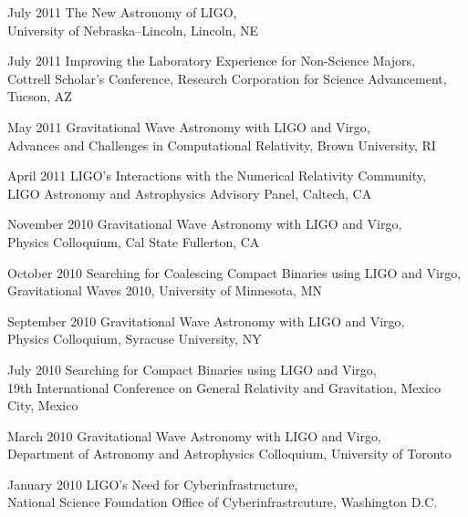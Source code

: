 \documentclass{cv}
\begin{document}
\begin{entry}
\item[July 2011] {The New Astronomy of LIGO},\\
{\small University of Nebraska--Lincoln, Lincoln, NE}

\item[July 2011] {Improving the Laboratory Experience for Non-Science Majors},\\
{\small Cottrell Scholar's Conference, Research Corporation for Science
Advancement, Tucson, AZ}

\item[May 2011] {Gravitational Wave Astronomy with LIGO and Virgo},\\
{\small Advances and Challenges in Computational Relativity, Brown University,
RI}

\item[April 2011] {LIGO's Interactions with the Numerical Relativity Community},\\
{\small LIGO Astronomy and Astrophysics Advisory Panel, Caltech, CA}

\item[November 2010] {Gravitational Wave Astronomy with LIGO and Virgo},\\
{\small Physics Colloquium, Cal State Fullerton, CA}

\item[October 2010] {Searching for Coalescing Compact Binaries using LIGO and
Virgo},\\
{\small Gravitational Waves 2010, University of Minnesota, MN}

\item[September 2010] {Gravitational Wave Astronomy with LIGO and Virgo},\\
{\small Physics Colloquium, Syracuse University, NY}

\item[July 2010] {Searching for Compact Binaries using LIGO and Virgo},\\
{\small 19th International Conference on General Relativity and Gravitation,
Mexico City, Mexico}

\item[March 2010] {Gravitational Wave Astronomy with LIGO and Virgo},\\
{\small Department of Astronomy and Astrophysics Colloquium, University of
Toronto}

\item[January 2010] {LIGO's Need for Cyberinfrastructure},\\
{\small National Science Foundation Office of Cyberinfrastrcuture, Washington
D.C.}


\end{entry}
\end{document}
